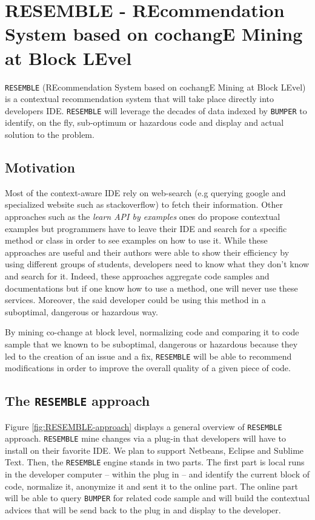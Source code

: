 
\section{RESEMBLE - REcommendation System based on cochangE Mining at Block LEvel\label{sec:RESEMBLE}}

{\tt RESEMBLE} (REcommendation System based on cochangE Mining at Block LEvel) is a contextual recommendation system that will take place directly into developers IDE. {\tt RESEMBLE} will leverage the decades of data indexed by {\tt BUMPER} to identify, on the fly, sub-optimum or hazardous code and display and actual solution to the problem. 

\subsection{Motivation}

Most of the context-aware IDE \cite{Brandt2009,JoelBrandt} rely on web-search (e.g querying google and specialized website such as stackoverflow) to fetch their information. 
Other approaches such as the {\it learn API by examples} ones \cite{Kim2011,Montandon2013} do propose contextual examples but programmers have to leave their IDE and search for a specific method or class in order to see examples on how to use it. 
While these approaches are useful and their authors were able to show their efficiency by using different groups of students, developers need to know what they don't know and search for it. 
Indeed, these approaches aggregate code samples and documentations but if one know how to use a method, one will never use these services.
Moreover, the said developer could be using this method in a suboptimal, dangerous or hazardous way. 

By mining co-change at block level, normalizing code and comparing it to code sample that we known to be suboptimal, dangerous or hazardous because they led to the creation of an issue and a fix, {\tt RESEMBLE} will be able to recommend modifications in order to improve the overall quality of a given piece of code.

\subsection{The {\tt RESEMBLE} approach}

Figure \ref{fig:RESEMBLE-approach} displays a general overview of {\tt RESEMBLE} approach. {\tt RESEMBLE} mine changes via a plug-in that developers will have to install on their favorite IDE. We plan to support Netbeans, Eclipse and Sublime Text.
Then, the {\tt RESEMBLE} engine stands in two parts. The first part is local runs in the developer computer -- within the plug in -- and identify the current block of code, normalize it, anonymize it and sent it to the online part.
The online part will be able to query {\tt BUMPER} for related code sample and will build the contextual advices that will be send back to the plug in and display to the developer.

